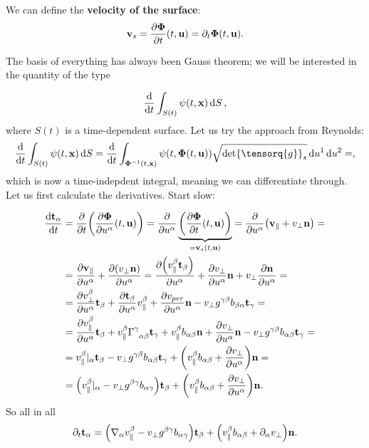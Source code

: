 \documentclass[../main.tex]{subfiles}
\begin{document}
We can define the \textbf{velocity of the surface}:
\begin{equation*}
	\vb{v}_s = \pdv{\vb*{\Phi}}{t}\qty(t,\vb{u}) = \partial_t \vb*{\Phi}\qty(t, \vb{u}).
\end{equation*}

The basis of everything has always been Gauss theorem; we will be interested in the quantity of the type

\[
	\dv{t} \int_{S(t)}\psi\qty(t,\vb{x})\dd{S},
\]
where $S(t)$ is a time-dependent surface. Let us try the approach from Reynolds:
\[
\dv{t} \int_{S(t)}\psi\qty(t,\vb{x})\dd{S} = \dv{t} \int_{\inverse{\vb*{\Phi}}\qty(t,\vb{x})}\psi(t,\vb*{\Phi}(t,\vb{u})) \sqrt{\det \tensorq{g}_s}\dd{u^1} \dd{u^2} = ,
\]
which is now a time-indepdent integral, meaning we can differentiate through. Let us first calculate the derivatives. Start slow:

\begin{align*}
	\dv{\vb{t}_{\alpha}}{t} &= \pdv{t}\qty(\pdv{\vb{\Phi}}{u^\alpha}\qty(t,\vb{u})) = \pdv{u^{\alpha}}\underbrace{\qty(\pdv{\vb{\Phi}}{t}\qty(t,\vb{u}))}_{= \vb{v}_s(t,\vb{u})} = \pdv{u^{\alpha}}\qty(\vb{v}_{\parallel}+v_{\perp}\vb{n}) = \\
				&= \pdv{\vb{v}_{\parallel}}{u^{\alpha}}+\pdv{\qty(v_{\perp} \vb{n})}{u^{\alpha}} = \pdv{\qty(v^{\beta}_{\parallel}\vb{t}_{\beta})}{u^{\alpha}}+\pdv{v_{\perp}}{u^{\alpha}}\vb{n}+ v_{\perp} \pdv{\vb{n}}{u^{\alpha}} = \\
				&=\pdv{v_{\perp}^{\beta}}{u^{\alpha}}\vb{t}_{\beta}+\pdv{\vb{t}_{\beta}}{u^{\alpha}}v^{\beta}_{\parallel}+\pdv{v_{per}}{u^{\alpha}}\vb{n} - v_{\perp} g^{\gamma \beta}b_{\beta \alpha}\vb{t}_{\gamma} = \\
				& = \pdv{v^{\beta}_{\parallel}}{u^{\alpha}}\vb{t}_{\beta}+v^{\beta}_{\parallel}\Gamma \indices{^{\gamma}_{\alpha \beta}} \vb{t}_{\gamma}+ v_{\parallel}^{\beta}b_{\alpha \beta} \vb{n} + \pdv{v_{\perp}}{u^{\alpha}}\vb{n}- v_{\perp}g^{\gamma \beta}b_{\alpha \beta}\vb{t}_{\gamma} =\\
				& = v^{\beta}_{\parallel}|_{\alpha} \vb{t}_{\beta}- v_{\perp}g^{\gamma \beta} b_{\alpha \beta}\vb{t}_{\gamma}+\qty(v^{\beta}_{\parallel}b_{\alpha \beta}+ \pdv{v_{\perp}}{u^{\alpha}})\vb{n} = \\
				& = \qty(v_{\parallel}^{\beta}|_{\alpha}-v_{\perp}g^{\beta \gamma} b_{\alpha \gamma})\vb{t}_{\beta}+ \qty(v_{\parallel}^{\beta}b_{\alpha \beta} + \pdv{v_{\perp}}{u^{\alpha}})\vb{n}.
\end{align*}
So all in all
\[
	\partial_t\vb{t}_{\alpha}= \qty(\nabla_{\alpha}v_{\parallel}^{\beta}-v_{\perp}g^{\beta \gamma} b_{\alpha \gamma})\vb{t}_{\beta}+ \qty(v_{\parallel}^{\beta}b_{\alpha \beta} + \partial_{\alpha}v_{\perp})\vb{n}.
\]
\end{document}
